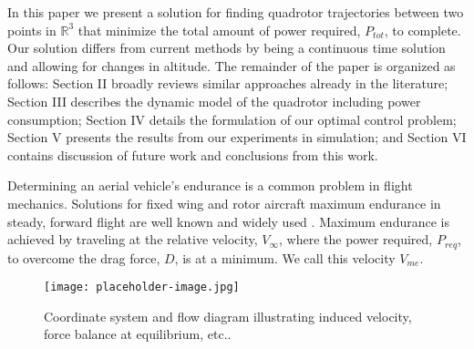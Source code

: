 In this paper we present a solution for finding quadrotor trajectories between two points in $\mathbb{R}^3$ that minimize the total amount of power required, $P_{tot}$, to complete. Our solution differs from current methods by being a continuous time solution and allowing for changes in altitude. The remainder of the paper is organized as follows: Section II broadly reviews similar approaches already in the literature; Section III describes the dynamic model of the quadrotor including power consumption; Section IV details the formulation of our optimal control problem; Section V presents the results from our experiments in simulation; and Section VI contains discussion of future work and conclusions from this work.

Determining an aerial vehicle's endurance is a common problem in flight mechanics. Solutions for fixed wing and rotor aircraft maximum endurance in steady, forward flight are well known and widely used \cite{anderson2005introduction,leishman2006principles}. Maximum endurance is achieved by traveling at the relative velocity, $V_\infty$, where the power required, $P_{req}$, to overcome the drag force, $D$, is at a minimum. We call this velocity $V_{me}$. 


\begin{figure}[ht]
    \label{QuadDiagram}
	\centering
	\texttt{[image: placeholder-image.jpg]}
	\caption{Coordinate system and flow diagram illustrating induced velocity, force balance at equilibrium, etc..}
\end{figure}
